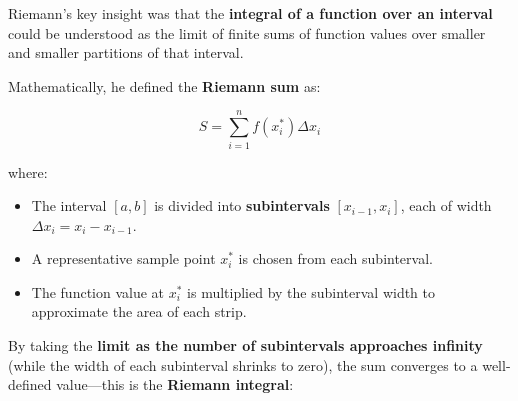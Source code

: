 Riemann’s key insight was that the \textbf{integral of a function over an interval} could be understood as the limit of finite sums of function values over smaller and smaller partitions of that interval.  

Mathematically, he defined the \textbf{Riemann sum} as:  

\[
S = \sum_{i=1}^{n} f(x_i^*) \Delta x_i
\]

where:  
\begin{itemize}
    \item The interval \([a, b]\) is divided into \textbf{subintervals} \([x_{i-1}, x_i]\), each of width \( \Delta x_i = x_i - x_{i-1} \).  
    \item A representative sample point \( x_i^* \) is chosen from each subinterval.  
    \item The function value at \( x_i^* \) is multiplied by the subinterval width to approximate the area of each strip.  
\end{itemize}

\begin{center}
\end{center}


By taking the \textbf{limit as the number of subintervals approaches infinity} (while the width of each subinterval shrinks to zero), the sum converges to a well-defined value—this is the \textbf{Riemann integral}:  

